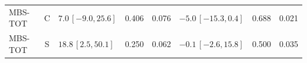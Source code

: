 \documentclass[10pt,a4paper]{article}
\begin{document}
\begin{longtable}{lcp{37mm}rrp{37mm}rr}
MBS-TOT & C & \(7.0\,[-9.0,25.6]\) & 0.406 & 0.076 & \(-5.0\,[-15.3,0.4]\) & 0.688 & 0.021\\
MBS-TOT & S & \(18.8\,[2.5,50.1]\) & 0.250 & 0.062 & \(-0.1\,[-2.6,15.8]\) & 0.500 & 0.035\\

\end{longtable}
\end{document}
